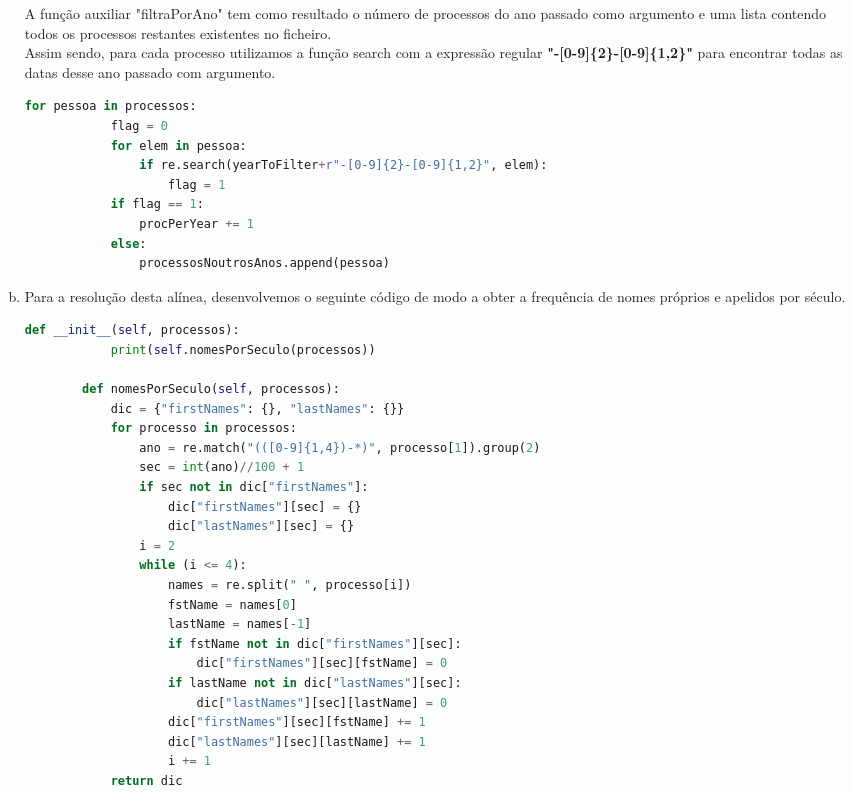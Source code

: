 \documentclass[11pt,a4paper]{report}%
\begin{document}
\begin{enumerate}[a)]
	A função auxiliar "filtraPorAno" tem como resultado o número de processos do ano passado como argumento e uma lista contendo todos os processos restantes existentes no ficheiro.\\
	Assim sendo, para cada processo utilizamos a função search com a expressão regular \textbf{"\--[0-9]\{2\}-[0-9]\{1,2\}"} para encontrar todas as datas desse ano passado com argumento.
	\begin{lstlisting}[language=python]
		for pessoa in processos:
			flag = 0
			for elem in pessoa:
				if re.search(yearToFilter+r"-[0-9]{2}-[0-9]{1,2}", elem):
					flag = 1
			if flag == 1:
				procPerYear += 1
			else:
				processosNoutrosAnos.append(pessoa)
	\end{lstlisting}
	
	
	\newpage
	
	
	\item Para a resolução desta alínea, desenvolvemos o seguinte código de modo a obter a frequência de nomes próprios e apelidos por século.
	\begin{lstlisting}[language=python]
		def __init__(self, processos):
			print(self.nomesPorSeculo(processos))
		
		def nomesPorSeculo(self, processos):
			dic = {"firstNames": {}, "lastNames": {}}
			for processo in processos:
				ano = re.match("(([0-9]{1,4})-*)", processo[1]).group(2)
				sec = int(ano)//100 + 1
				if sec not in dic["firstNames"]:
					dic["firstNames"][sec] = {}
					dic["lastNames"][sec] = {}
				i = 2
				while (i <= 4):
					names = re.split(" ", processo[i])
					fstName = names[0]
					lastName = names[-1]
					if fstName not in dic["firstNames"][sec]:
						dic["firstNames"][sec][fstName] = 0
					if lastName not in dic["lastNames"][sec]:
						dic["lastNames"][sec][lastName] = 0
					dic["firstNames"][sec][fstName] += 1
					dic["lastNames"][sec][lastName] += 1
					i += 1
			return dic
	\end{lstlisting}


\end{enumerate}
\end{document}

